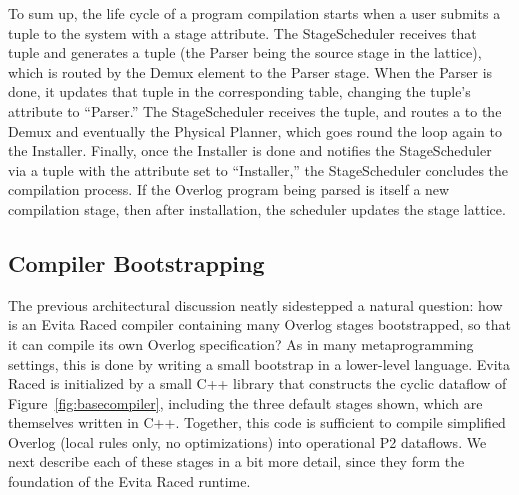 To sum up, the life cycle of a program compilation starts when a user
submits a  tuple to the system with a  stage
attribute. The StageScheduler receives that  tuple and
generates a
 tuple (the Parser being the source stage in the
lattice), which is routed by the Demux element to
the Parser stage. When the Parser is done, it updates that  tuple
in the corresponding table, changing the tuple's attribute to
``Parser.''  The StageScheduler receives the  tuple, and routes a
 to the Demux and eventually the Physical Planner, which goes round the loop again to the
Installer.  Finally, once the Installer is done and notifies the
StageScheduler via a  tuple with the  attribute set to
``Installer,'' the StageScheduler concludes the compilation process.
If the Overlog program being parsed is itself a new compilation stage, then after
installation, the scheduler updates the stage lattice.


\subsection{Compiler Bootstrapping}
\label{sec:bootstrap}
The previous architectural discussion neatly sidestepped a natural question: how is an Evita Raced compiler containing many Overlog stages bootstrapped, so that it can compile its own Overlog specification?
As in many metaprogramming settings, this is done by writing a small bootstrap  in a lower-level language. Evita Raced is initialized by a small C++ library that constructs the cyclic dataflow of Figure~\ref{fig:basecompiler}, including the three default stages shown, which are themselves written in C++. %
Together, this code is sufficient
to compile simplified Overlog (local rules only, no optimizations) into
operational P2 dataflows. We next describe each of these stages in a bit
more detail, since they form the foundation of the Evita Raced runtime.




